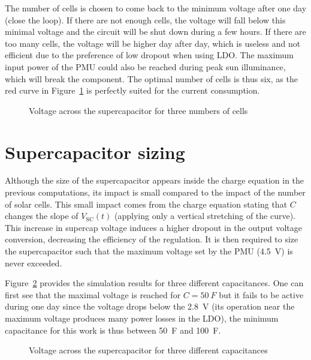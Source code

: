 \documentclass{EPL-master-thesis-covers-EN}
\newcommand{\te}[1]{\textrm{#1}}
\begin{document}
The number of cells is chosen to come back to the minimum voltage after one day (close the loop). If there are not enough cells, the voltage will fall below this minimal voltage and the circuit will be shut down during a few hours. If there are too many cells, the voltage will be higher day after day, which is useless and not efficient due to the preference of low dropout when using LDO. The maximum input power of the PMU could also be reached during peak sun illuminance, which will break the component. The optimal number of cells is thus six, as the red curve in  Figure~\ref{fig:Supercap_voltage} is perfectly suited for the current consumption.

\begin{figure}[H]
    \centering
    
    \caption{Voltage across the supercapacitor for three numbers of cells}
    \label{fig:Supercap_voltage}
\end{figure}

\section{Supercapacitor sizing}
\label{supercap_sizing}

Although the size of the supercapacitor appears inside the charge equation in the previous computations, its impact is small compared to the impact of the number of solar cells. This small impact comes from the charge equation stating that $C$ changes the slope of $V_\te{SC}(t)$ (applying only a vertical stretching of the curve). This increase in supercap voltage induces a higher dropout in the output voltage conversion, decreasing the efficiency of the regulation. It is then required to size the supercapacitor such that the maximum voltage set by the PMU (\SI{4.5}{V}) is never exceeded.

Figure~\ref{fig:Supercap_voltage_C} provides the simulation results for three different capacitances. One can first see that the maximal voltage is reached for $C = \SI{50}{F}$ but it fails to be active during one day since the voltage drops below the \SI{2.8}{V} (its operation near the maximum voltage produces many power losses in the LDO), the minimum capacitance for this work is thus between \SI{50}{F} and \SI{100}{F}.

\begin{figure}[H]
    \centering
    
    \caption{Voltage across the supercapacitor for three different capacitances}
    \label{fig:Supercap_voltage_C}
\end{figure}
\end{document}
